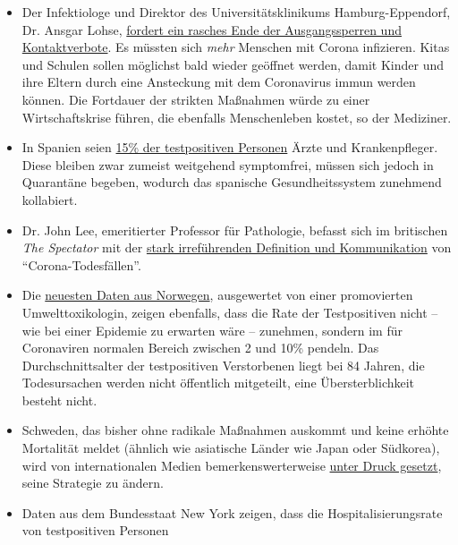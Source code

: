 \begin{itemize}
\tightlist
\item
  Der Infektiologe und Direktor des Universitätsklinikums
  Hamburg-Eppendorf, Dr. Ansgar Lohse,
  \href{https://www.mopo.de/hamburg/uke-infektiologe-fordert-es-muessen-sich-mehr-menschen-mit-corona-infizieren-36483636}{fordert
  ein rasches Ende der Ausgangssperren und Kontaktverbote}. Es müssten
  sich \emph{mehr} Menschen mit Corona infizieren. Kitas und Schulen
  sollen möglichst bald wieder geöffnet werden, damit Kinder und ihre
  Eltern durch eine Ansteckung mit dem Coronavirus immun werden können.
  Die Fortdauer der strikten Maßnahmen würde zu einer Wirtschaftskrise
  führen, die ebenfalls Menschenleben kostet, so der Mediziner.
\item
  In Spanien seien
  \href{https://www.heise.de/tp/features/Das-ist-keine-Krise-sondern-eine-Katastrophe-4694104.html}{15\%
  der testpositiven Personen} Ärzte und Krankenpfleger. Diese bleiben
  zwar zumeist weitgehend symptomfrei, müssen sich jedoch in Quarantäne
  begeben, wodurch das spanische Gesundheitssystem zunehmend kollabiert.
\item
  Dr. John Lee, emeritierter Professor für Pathologie, befasst sich im
  britischen \emph{The Spectator} mit der
  \href{https://www.spectator.co.uk/article/how-to-understand-and-report-figures-for-covid-19-deaths-}{stark
  irreführenden Definition und Kommunikation} von
  ``Corona-Todesfällen''.
\item
  Die
  \href{https://swprs.files.wordpress.com/2020/04/die-lage-in-norwegen.pdf}{neuesten
  Daten aus Norwegen}, ausgewertet von einer promovierten
  Umwelt­toxikologin, zeigen ebenfalls, dass die Rate der Testpositiven
  nicht -- wie bei einer Epidemie zu erwarten wäre -- zunehmen, sondern
  im für Coronaviren normalen Bereich zwischen 2 und 10\% pendeln. Das
  Durchschnittsalter der testpositiven Verstorbenen liegt bei 84 Jahren,
  die Todesursachen werden nicht öffentlich mitgeteilt, eine
  Übersterblichkeit besteht nicht.
\item
  Schweden, das bisher ohne radikale Maßnahmen auskommt und keine
  erhöhte Mortalität meldet (ähnlich wie asiatische Länder wie Japan
  oder Südkorea), wird von internationalen Medien bemerkenswerterweise
  \href{https://www.theguardian.com/world/2020/mar/30/catastrophe-sweden-coronavirus-stoicism-lockdown-europe}{unter
  Druck gesetzt}, seine Strategie zu ändern.
\item
  Daten aus dem Bundesstaat New York zeigen, dass die
  Hospitalisierungsrate von testpositiven Personen

\end{itemize}
